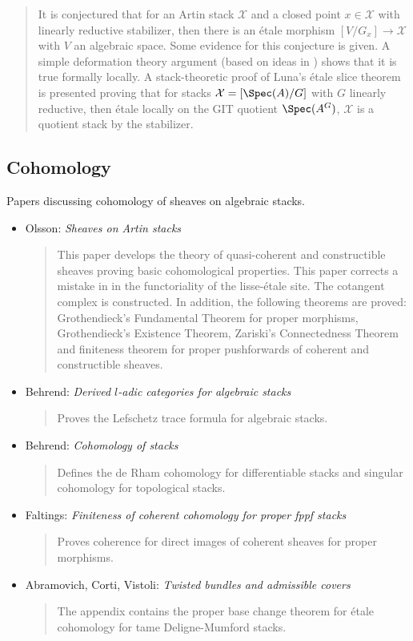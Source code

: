 \begin{itemize}
\cite{alper_quotient}
\begin{quote}
It is conjectured that for an Artin stack $\mathcal{X}$ and a closed point $x
\in \mathcal{X}$
with linearly reductive stabilizer, then there is an \'etale morphism $[V/G_x]
\to \mathcal{X}$ with $V$ an algebraic space. Some evidence for this
conjecture is
given. A simple deformation theory argument (based on ideas in \cite{tame})
shows that it is true formally locally. A stack-theoretic proof of Luna's
\'etale slice theorem is presented proving that for stacks
$\mathcal{X} = [\Spec(A)/G]$
with $G$ linearly reductive, then \'etale locally on the GIT quotient
$\Spec(A^G)$, $\mathcal{X}$ is a quotient stack by the stabilizer.
\end{quote}
\end{itemize}

\subsection{Cohomology}
\label{subsection-cohomology}

\noindent
Papers discussing cohomology of sheaves on algebraic stacks.
\begin{itemize}
\item Olsson: \emph{Sheaves on Artin stacks} \cite{olsson_sheaves}
\begin{quote}
This paper develops the theory of quasi-coherent and constructible sheaves
proving basic cohomological properties. This paper corrects a mistake in
\cite{LM-B} in the functoriality of the lisse-\'etale site. The cotangent
complex is constructed. In addition, the following theorems are proved:
Grothendieck's Fundamental Theorem for proper morphisms, Grothendieck's
Existence Theorem, Zariski's Connectedness Theorem and finiteness theorem
for proper pushforwards of coherent and constructible sheaves.
\end{quote}
\item Behrend: \emph{Derived $l$-adic categories for algebraic stacks}
\cite{behrend_derived}
\begin{quote}
Proves the Lefschetz trace formula for algebraic stacks.
\end{quote}
\item Behrend: \emph{Cohomology of stacks} \cite{behrend_cohomology}
\begin{quote}
Defines the de Rham cohomology for differentiable stacks and singular
cohomology for topological stacks.
\end{quote}
\item Faltings:
\emph{Finiteness of coherent cohomology for proper fppf stacks}
\cite{faltings_finiteness}
\begin{quote}
Proves coherence for direct images of coherent sheaves for proper morphisms.
\end{quote}
\item Abramovich, Corti, Vistoli:
\emph{Twisted bundles and admissible covers} \cite{acv}
\begin{quote}
The appendix contains the proper base change theorem for \'etale cohomology
for tame Deligne-Mumford stacks.
\end{quote}
\end{itemize}


